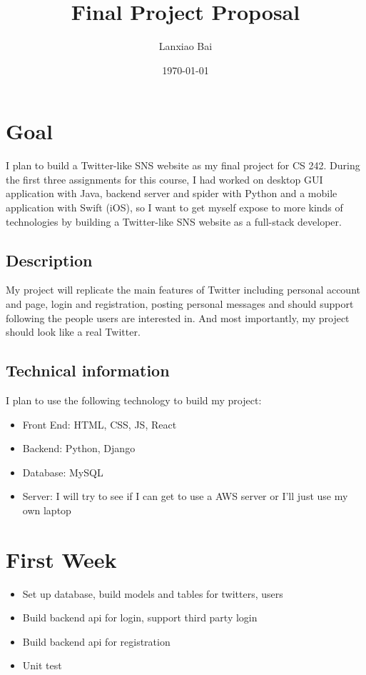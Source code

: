 \documentclass[11pt]{article}
\begin{document}
\title{Final Project Proposal}
\author{Lanxiao Bai}
\date{\today}
\maketitle
\newpage
\section{Goal}
	I plan to build a Twitter-like SNS website as my final project for CS 242. During the first three assignments for this course, I had worked on desktop GUI application with Java, backend server and spider with Python and a mobile application with Swift (iOS), so I want to get myself expose to more kinds of technologies by building a Twitter-like SNS website as a full-stack developer.
	\subsection{Description} 
	
	My project will replicate the main features of Twitter including personal account and page, login and registration, posting personal messages and should support following the people users are interested in. And most importantly, my project should look like a real Twitter.
	
	\subsection{Technical information}
	I plan to use the following technology to build my project:
	\begin{itemize}
		\item Front End: HTML, CSS, JS, React
		\item Backend: Python, Django
		\item Database: MySQL
		\item Server: I will try to see if I can get to use a AWS server or I'll just use my own laptop
	\end{itemize}
\section{First Week}
	\begin{itemize}
		\item Set up database, build models and tables for twitters, users
		\item Build backend api for login, support third party login
		\item Build backend api for registration
		\item Unit test
	\end{itemize}
\end{document}
